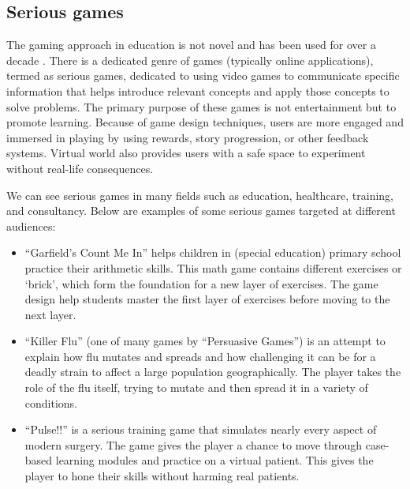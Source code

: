 \subsection{Serious games}
The gaming approach in education is not novel and has been used for over a decade \cite{almeida_2012}. There is a dedicated genre of games (typically online applications), termed as serious games, dedicated to using video games to communicate specific information that helps introduce relevant concepts and apply those concepts to solve problems.  The primary purpose of these games is not entertainment but to promote learning. Because of game design techniques, users are more engaged and immersed in playing by using rewards, story progression, or other feedback systems. Virtual world also provides users with a safe space to experiment without real-life consequences.

We can see serious games in many fields such as education, healthcare, training, and consultancy. Below are examples of some serious games targeted at different audiences:
\begin{itemize}
    \item “Garfield’s Count Me In”\cite{count_me_in} helps children in (special education) primary school practice their arithmetic skills.  This math game contains different exercises or ‘brick’, which form the foundation for a new layer of exercises. The game design help students master the first layer of exercises before moving to the next layer.

    \item “Killer Flu”\cite{killer_flu} (one of many games by “Persuasive Games”) is an attempt to explain how flu mutates and spreads and how challenging it can be for a deadly strain to affect a large population geographically. The player takes the role of the flu itself, trying to mutate and then spread it in a variety of conditions.

    \item  “Pulse!!”\cite{pulse} is a serious training game that simulates nearly every aspect of modern surgery. The game gives the player a chance to move through case-based learning modules and practice on a virtual patient. This gives the player to hone their skills without harming real patients.
\end{itemize}

